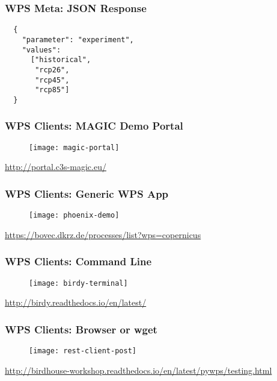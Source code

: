 \documentclass{beamer}
\begin{document}
\begin{frame}[fragile]
\frametitle<presentation>{WPS Meta: JSON Response}
  \lstset{language=JSON}
  \begin{lstlisting}
  {
    "parameter": "experiment",
    "values":
      ["historical",
       "rcp26",
       "rcp45",
       "rcp85"]
  }
  \end{lstlisting}

\end{frame}

\begin{frame}
\frametitle<presentation>{WPS Clients: MAGIC Demo Portal}

  \begin{figure}[ht]
    \centering
    \texttt{[image: magic-portal]}
  \end{figure}

  \centering
  \footnotesize{\url{http://portal.c3s-magic.eu/}}

\end{frame}

\begin{frame}
\frametitle<presentation>{WPS Clients: Generic WPS App}

  \begin{figure}[ht]
    \centering
    \texttt{[image: phoenix-demo]}
  \end{figure}

  \centering
  \footnotesize{\url{https://bovec.dkrz.de/processes/list?wps=copernicus}}

\end{frame}

\begin{frame}
\frametitle<presentation>{WPS Clients: Command Line}

  \begin{figure}[ht]
    \centering
    \texttt{[image: birdy-terminal]}
  \end{figure}

  \centering
  \footnotesize{\url{http://birdy.readthedocs.io/en/latest/}}

\end{frame}

\begin{frame}
\frametitle<presentation>{WPS Clients: Browser or wget}

  \begin{figure}[ht]
    \centering
    \texttt{[image: rest-client-post]}
  \end{figure}

  \centering
  \footnotesize{\url{http://birdhouse-workshop.readthedocs.io/en/latest/pywps/testing.html}}

\end{frame}
\end{document}
